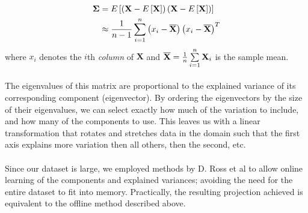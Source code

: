 \documentclass{article}
\begin{document}
\begin{multicols}{2}
\begin{align*}
\mathbf \Sigma &= E\left[\left(\mathbf X - E\left[\mathbf X\right]\right) \left(\mathbf X - E\left[\mathbf X\right]\right)\right]\\
&\approx {1 \over n-1} \sum\limits_{i=1}^n \left(x_i - \overline{\mathbf X}\right)
\left(x_i - \overline{\mathbf X}\right)^T
\end{align*}
where $x_i$ denotes the $i$th \emph{column} of $\mathbf X$ and $\overline{\mathbf X} = {1 \over n}\sum\limits_{i=1}^n \mathbf X_i$ is the sample mean.\\
\\
The eigenvalues of this matrix are proportional to the explained variance of its corresponding component (eigenvector). By ordering the eigenvectors by the size of their eigenvalues, we can select exactly how much of the variation to include, and how many of the components to use. This leaves us with a linear transformation that rotates and stretches data in the domain such that the first axis explains more variation then all others, then the second, etc.\\
\\
Since our dataset is large, we employed methods by D. Ross et al \cite{IncrementalPCA} to allow online learning of the components and explained variances; avoiding the need for the entire dataset to  fit into memory. Practically, the resulting projection achieved is equivalent to the offline method described above.


\end{multicols}
\end{document}
